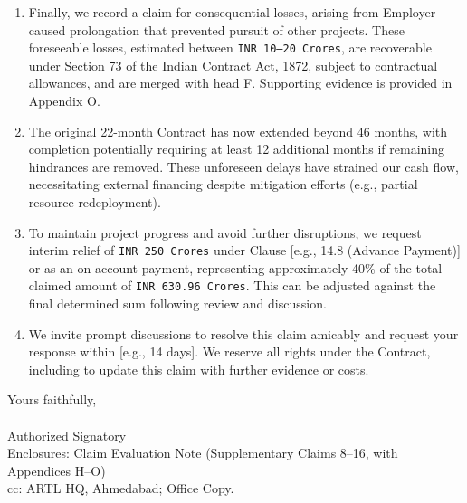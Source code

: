 \documentclass[12pt,letterpaper]{article}
\begin{document}
\begin{enumerate}
		\item Finally, we record a claim for consequential losses, arising from Employer-caused prolongation that prevented pursuit of other projects. These foreseeable losses, estimated between \texttt{INR 10--20 Crores}, are recoverable under Section 73 of the Indian Contract Act, 1872, subject to contractual allowances, and are merged with head F. Supporting evidence is provided in Appendix O.
		\item The original 22-month Contract has now extended beyond 46 months, with completion potentially requiring at least 12 additional months if remaining hindrances are removed. These unforeseen delays have strained our cash flow, necessitating external financing despite mitigation efforts (e.g., partial resource redeployment).
		\item To maintain project progress and avoid further disruptions, we request interim relief of \texttt{INR 250 Crores} under Clause [e.g., 14.8 (Advance Payment)] or as an on-account payment, representing approximately 40\% of the total claimed amount of \texttt{INR 630.96 Crores}. This can be adjusted against the final determined sum following review and discussion.
		\item We invite prompt discussions to resolve this claim amicably and request your response within [e.g., 14 days]. We reserve all rights under the Contract, including to update this claim with further evidence or costs.
	\end{enumerate}
	
	Yours faithfully, \\
	\vspace{1cm} \\
	Authorized Signatory \\

	
	Enclosures: Claim Evaluation Note (Supplementary Claims 8--16, with Appendices H--O) \\
	cc: ARTL HQ, Ahmedabad; Office Copy.
	
\end{document}
